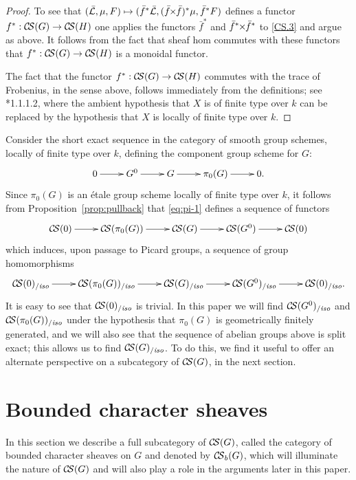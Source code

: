 \documentclass[11pt]{amsart}
\theoremstyle{plain}
\theoremstyle{definition}
\theoremstyle{remark}
\newcommand{\Fq}{k}
\newcommand{\gcs}[1]{{\mathcal{\bar #1}}}
\newcommand{\CS}{{\mathcal{C\hskip-1.8pt S}}}
\newcommand{\CSiso}[1]{\CS(#1)_{/\textit{iso}}}
\newcommand{\tightertimes}{\hskip-3pt\times\hskip-3pt}
\renewcommand{\bf}{\bar{f}}
\newcommand{\bfxf}{\bar{f} \tightertimes \bar{f}}
\newcommand\Clifton[1]{\marginpar{\smaller\smaller CC: #1}}
\begin{document}
\begin{proof}
  To see that $(\gcs{L},\mu,F) \mapsto (\bf^*\gcs{L},(\bfxf)^*\mu,\bf^*F)$
  defines a functor $f^* : \CS(G) \to \CS(H)$ one applies the functors $\bf^*$ and
  $\bf^*\tightertimes\bf^*$ to \ref{CS.3} and argue as
  above. It follows from the fact that sheaf hom commutes with these
  functors that $f^* : \CS(G) \to \CS(H)$ is a monoidal functor.

  The fact that the functor $f^* : \CS(G) \to \CS(H)$ commutes with
  the trace of Frobenius, in the sense above, follows immediately from
  the definitions; see \cite{Laumon}*{1.1.1.2}, where the ambient
  hypothesis that $X$ is of finite type over $\Fq$ can be replaced by
  the hypothesis that $X$ is locally of finite type over $\Fq$.
  \Clifton{I have not proved $(f\circ g)^* = g^* \circ f^*$, yet.}
\end{proof}

Consider the short exact sequence in the category of smooth group
schemes, locally of finite type over $\Fq$, defining the component
group scheme for $G$:
 \begin{equation}\label{eq:pi-1}
   \xymatrix{
     0 \ar[r] & G^0 \ar[r] & G \ar[r] & \pi_0(G) \ar[r] & 0.
    }
 \end{equation}
Since $\pi_0(G)$ is an étale group scheme locally of finite type over $\Fq$, 
it follows from Proposition~\ref{prop:pullback} that \eqref{eq:pi-1} defines a sequence of functors
 \[
  \xymatrix{
\CS(0) \ar[r] & \CS(\pi_0(G)) \ar[r] & \CS(G) \ar[r] & \CS(G^0) \ar[r] & \CS(0)
  }
 \]
which induces, upon passage to Picard groups, a sequence of group homomorphisms 
 \[
  \xymatrix{
\CSiso{0} \ar[r] & \CSiso{\pi_0(G)} \ar[r] & \CSiso{G} \ar[r] & \CSiso{G^0} \ar[r] & \CSiso{0}.
  }
 \]
It is easy to see that $\CSiso{0}$ is trivial. In this paper we will find $\CSiso{G^0}$ and $\CSiso{\pi_0(G)}$ under the hypothesis that $\pi_0(G)$ is geometrically finitely generated, and we will also see that the sequence of abelian groups above is split exact; this allows us to find $\CSiso{G}$. To do this, we find it useful to offer an alternate perspective on a subcategory of $\CS(G)$, in the next section.
 
\section{Bounded character sheaves}

In this section we describe a full subcategory of $\CS(G)$, called the category of bounded character sheaves on $G$ and denoted by $\CS_b(G)$, which will illuminate the nature of $\CS(G)$ and will also play a role in the arguments later in this paper.
\end{document}
